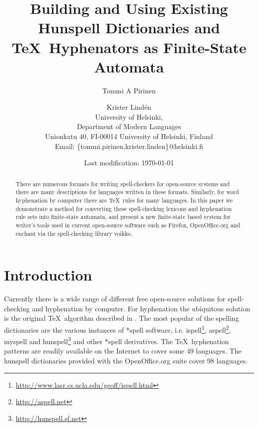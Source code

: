 \documentclass[postprint]{flammie}
\begin{document}
\title{Building and Using Existing Hunspell Dictionaries and \TeX\ Hyphenators
  as Finite-State Automata}

\author{Tommi A Pirinen \and Krister Lind\'{e}n\\
  University of Helsinki,\\
    Department of Modern Languages\\
    Unionkatu 40, FI-00014 University of Helsinki, Finland\\
    Email: \{tommi.pirinen,krister.linden\}@helsinki.fi}


\date{Last modification: \today}

\maketitle

\begin{abstract}
  There are numerous formats for writing spell-checkers for
  open-source systems and there are many descriptions for languages
  written in these formats. Similarly, for word hyphenation by
  computer there are \TeX\ rules for many languages. In this paper we
  demonstrate a method for converting these spell-checking lexicons
  and hyphenation rule sets into finite-state automata, and present a
  new finite-state based system for writer's tools used in current
  open-source software such as Firefox, OpenOffice.org and enchant via
  the spell-checking library voikko.
\end{abstract}


\section{Introduction}
\label{sec:introduction}

Currently there is a wide range of different free open-source
solutions for spell-checking and hyphenation by computer. For
hyphenation the ubiquitous solution is the original \TeX\ algorithm
described in \cite{liang/1983}.  The most popular of the spelling
dictionaries are the various instances of *spell software, i.e.
ispell\footnote{\url{http://www.lasr.cs.ucla.edu/geoff/ispell.html}},
aspell\footnote{\url{http://aspell.net}}, myspell and
hunspell\footnote{\url{http://hunspell.sf.net}} and other *spell
derivatives.  The \TeX\ hyphenation patterns are readily available on
the Internet to cover some 49 languages. The hunspell dictionaries
provided with the OpenOffice.org suite cover 98 languages.
\end{document}
